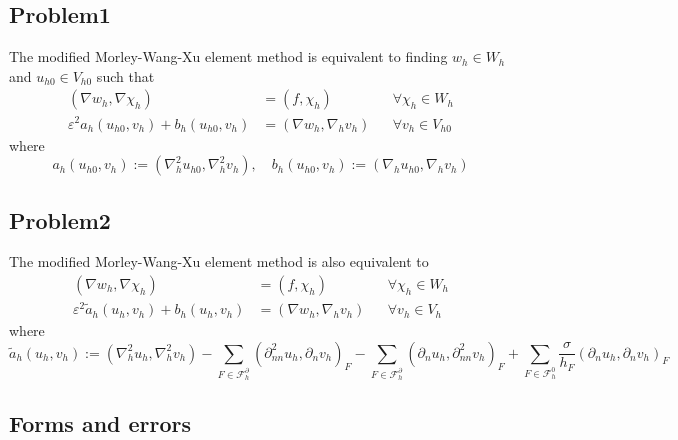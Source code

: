 \documentclass[11pt]{article}
\begin{document}
    \subsection{Problem1}\label{problem1}

    The modified Morley-Wang-Xu element method is equivalent to finding
\(w_{h} \in W_{h}\) and \(u_{h 0} \in V_{h 0}\) such that \[
\begin{aligned}
\left(\nabla w_{h}, \nabla \chi_{h}\right) &=\left(f, \chi_{h}\right) & & \forall \chi_{h} \in W_{h} \\
\varepsilon^{2} a_{h}\left(u_{h 0}, v_{h}\right)+b_{h}\left(u_{h 0}, v_{h}\right) &=\left(\nabla w_{h}, \nabla_{h} v_{h}\right) & & \forall v_{h} \in V_{h 0}
\end{aligned}
\] where \[
a_{h}\left(u_{h 0}, v_{h}\right):=\left(\nabla_{h}^{2} u_{h 0}, \nabla_{h}^{2} v_{h}\right), \quad b_{h}\left(u_{h 0}, v_{h}\right):=\left(\nabla_{h} u_{h 0}, \nabla_{h} v_{h}\right)
\]

    \subsection{Problem2}\label{problem2}

    The modified Morley-Wang-Xu element method is also equivalent to \[
\begin{aligned}
\left(\nabla w_{h}, \nabla \chi_{h}\right) &=\left(f, \chi_{h}\right) & & \forall \chi_{h} \in W_{h} \\
\varepsilon^{2} \tilde{a}_{h}\left(u_{h}, v_{h}\right)+b_{h}\left(u_{h}, v_{h}\right) &=\left(\nabla w_{h}, \nabla_{h} v_{h}\right) & & \forall v_{h} \in V_{h}
\end{aligned}
\] where \[
\tilde{a}_{h}\left(u_{h}, v_{h}\right):=\left(\nabla_{h}^{2} u_{h}, \nabla_{h}^{2} v_{h}\right)-\sum_{F \in \mathcal{F}_{h}^{\partial}}\left(\partial_{n n}^{2} u_{h}, \partial_{n} v_{h}\right)_{F}-\sum_{F \in \mathcal{F}_{h}^{\partial}}\left(\partial_{n} u_{h}, \partial_{n n}^{2} v_{h}\right)_{F}+\sum_{F \in \mathcal{F}_{h}^{0}} \frac{\sigma}{h_{F}}\left(\partial_{n} u_{h}, \partial_{n} v_{h}\right)_{F}
\]

    \subsection{Forms and errors}\label{forms-and-errors}
\end{document}
